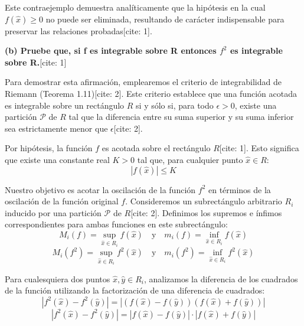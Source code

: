\documentclass[11pt,letterpaper]{article}
\begin{document}
Este contraejemplo demuestra analíticamente que la hipótesis en la cual $f(\hat{x}) \ge 0$ no puede ser eliminada, resultando de carácter indispensable para preservar las relaciones probadas[cite: 1].

\textbf{(b) Pruebe que, si f es integrable sobre R entonces $f^{2}$ es integrable sobre R.}[cite: 1]

Para demostrar esta afirmación, emplearemos el criterio de integrabilidad de Riemann (Teorema 1.11)[cite: 2]. Este criterio establece que una función acotada es integrable sobre un rectángulo $R$ si y sólo si, para todo $\epsilon > 0$, existe una partición $\mathcal{P}$ de $R$ tal que la diferencia entre su suma superior y su suma inferior sea estrictamente menor que $\epsilon$[cite: 2].

Por hipótesis, la función $f$ es acotada sobre el rectángulo $R$[cite: 1]. Esto significa que existe una constante real $K > 0$ tal que, para cualquier punto $\hat{x} \in R$:
\begin{equation*}
|f(\hat{x})| \le K
\end{equation*}

Nuestro objetivo es acotar la oscilación de la función $f^{2}$ en términos de la oscilación de la función original $f$. Consideremos un subrectángulo arbitrario $R_{i}$ inducido por una partición $\mathcal{P}$ de $R$[cite: 2]. Definimos los supremos e ínfimos correspondientes para ambas funciones en este subrectángulo:
\begin{equation*}
M_{i}(f) = \sup_{\hat{x} \in R_{i}} f(\hat{x}) \quad \text{y} \quad m_{i}(f) = \inf_{\hat{x} \in R_{i}} f(\hat{x})
\end{equation*}
\begin{equation*}
M_{i}(f^{2}) = \sup_{\hat{x} \in R_{i}} f^{2}(\hat{x}) \quad \text{y} \quad m_{i}(f^{2}) = \inf_{\hat{x} \in R_{i}} f^{2}(\hat{x})
\end{equation*}

Para cualesquiera dos puntos $\hat{x}, \hat{y} \in R_{i}$, analizamos la diferencia de los cuadrados de la función utilizando la factorización de una diferencia de cuadrados:
\begin{equation*}
|f^{2}(\hat{x}) - f^{2}(\hat{y})| = |(f(\hat{x}) - f(\hat{y}))(f(\hat{x}) + f(\hat{y}))|
\end{equation*}
\begin{equation*}
|f^{2}(\hat{x}) - f^{2}(\hat{y})| = |f(\hat{x}) - f(\hat{y})| \cdot |f(\hat{x}) + f(\hat{y})|
\end{equation*}
\end{document}
